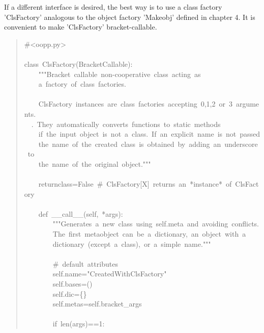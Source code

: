 \documentclass[10pt,english]{article}
\begin{document}
If a different interface is desired, the best way is to use a class
factory 'ClsFactory' analogous to the object factory 'Makeobj' 
defined in chapter 4. It is convenient to make 'ClsFactory'
bracket-callable.
\begin{quote}
\begin{ttfamily}\begin{flushleft}
\mbox{{\#}<oopp.py>}\\
\mbox{}\\
\mbox{class~ClsFactory(BracketCallable):}\\
\mbox{~~~~"""Bracket~callable~non-cooperative~class~acting~as~}\\
\mbox{~~~~a~factory~of~class~factories.}\\
\mbox{}\\
\mbox{~~~~ClsFactory~instances~are~class~factories~accepting~0,1,2~or~3~arguments.~}\\
\mbox{~~.~They~automatically~converts~functions~to~static~methods~}\\
\mbox{~~~~if~the~input~object~is~not~a~class.~If~an~explicit~name~is~not~passed}\\
\mbox{~~~~the~name~of~the~created~class~is~obtained~by~adding~an~underscore~to~}\\
\mbox{~~~~the~name~of~the~original~object."""}\\
\mbox{~~~~}\\
\mbox{~~~~returnclass=False~{\#}~ClsFactory[X]~returns~an~*instance*~of~ClsFactory}\\
\mbox{}\\
\mbox{~~~~def~{\_}{\_}call{\_}{\_}(self,~*args):}\\
\mbox{~~~~~~~~"""Generates~a~new~class~using~self.meta~and~avoiding~conflicts.}\\
\mbox{~~~~~~~~The~first~metaobject~can~be~a~dictionary,~an~object~with~a}\\
\mbox{~~~~~~~~dictionary~(except~a~class),~or~a~simple~name."""}\\
\mbox{~~~~~~~~}\\
\mbox{~~~~~~~~{\#}~default~attributes}\\
\mbox{~~~~~~~~self.name="CreatedWithClsFactory"~~~~}\\
\mbox{~~~~~~~~self.bases=()}\\
\mbox{~~~~~~~~self.dic={\{}{\}}}\\
\mbox{~~~~~~~~self.metas=self.bracket{\_}args}\\
\mbox{}\\
\mbox{~~~~~~~~if~len(args)==1:}\\

\end{flushleft}
\end{ttfamily}
\end{quote}
\end{document}
